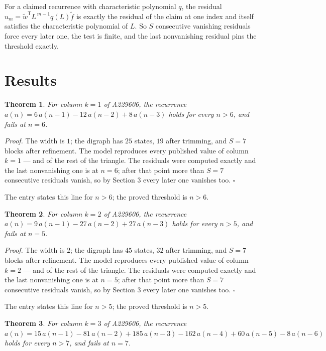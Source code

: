 \documentclass[11pt]{article}
\newtheorem{theorem}{Theorem}
\theoremstyle{definition}
\begin{document}
For a claimed recurrence with characteristic polynomial $q$, the residual $u_m = \tilde w^{\mathsf T}L^{\,m-1}q(L)\tilde f$ is exactly the residual of the claim at one index and itself satisfies the characteristic polynomial of $L$. So $S$ consecutive vanishing residuals force every later one, the test is finite, and the last nonvanishing residual pins the threshold exactly.

\section{Results}

\begin{theorem} For column $k = 1$ of A229606, the recurrence $a(n) = 6\,a(n-1) - 12\,a(n-2) + 8\,a(n-3)$ holds for every $n > 6$, and fails at $n = 6$.\end{theorem}

{\itshape Proof.} The width is $1$; the digraph has $25$ states, $19$ after trimming, and $S = 7$ blocks after refinement. The model reproduces every published value of column $k = 1$ --- and of the rest of the triangle. The residuals were computed exactly and the last nonvanishing one is at $n = 6$; after that point more than $S = 7$ consecutive residuals vanish, so by Section 3 every later one vanishes too. $\square$

The entry states this line for $n > 6$; the proved threshold is $n > 6$.

\begin{theorem} For column $k = 2$ of A229606, the recurrence $a(n) = 9\,a(n-1) - 27\,a(n-2) + 27\,a(n-3)$ holds for every $n > 5$, and fails at $n = 5$.\end{theorem}

{\itshape Proof.} The width is $2$; the digraph has $45$ states, $32$ after trimming, and $S = 7$ blocks after refinement. The model reproduces every published value of column $k = 2$ --- and of the rest of the triangle. The residuals were computed exactly and the last nonvanishing one is at $n = 5$; after that point more than $S = 7$ consecutive residuals vanish, so by Section 3 every later one vanishes too. $\square$

The entry states this line for $n > 5$; the proved threshold is $n > 5$.

\begin{theorem} For column $k = 3$ of A229606, the recurrence $a(n) = 15\,a(n-1) - 81\,a(n-2) + 185\,a(n-3) - 162\,a(n-4) + 60\,a(n-5) - 8\,a(n-6)$ holds for every $n > 7$, and fails at $n = 7$.\end{theorem}
\end{document}
